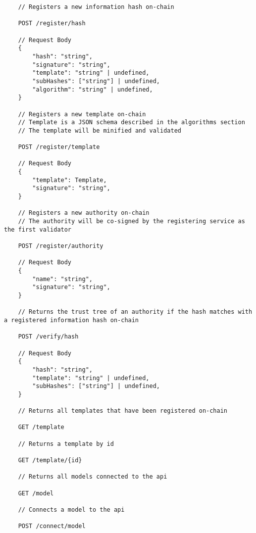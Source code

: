 \documentclass[../ockr-specification.tex]{subfiles}
\begin{document}
\begin{lstlisting}
    // Registers a new information hash on-chain

    POST /register/hash

    // Request Body
    {
        "hash": "string",
        "signature": "string",
        "template": "string" | undefined,
        "subHashes": ["string"] | undefined,
        "algorithm": "string" | undefined,
    }

    // Registers a new template on-chain
    // Template is a JSON schema described in the algorithms section
    // The template will be minified and validated 

    POST /register/template

    // Request Body
    {
        "template": Template,
        "signature": "string",
    }

    // Registers a new authority on-chain
    // The authority will be co-signed by the registering service as the first validator

    POST /register/authority

    // Request Body
    {
        "name": "string",
        "signature": "string",
    }

    // Returns the trust tree of an authority if the hash matches with a registered information hash on-chain

    POST /verify/hash

    // Request Body
    {
        "hash": "string",
        "template": "string" | undefined,
        "subHashes": ["string"] | undefined,
    }

    // Returns all templates that have been registered on-chain

    GET /template

    // Returns a template by id

    GET /template/{id}

    // Returns all models connected to the api

    GET /model

    // Connects a model to the api

    POST /connect/model

\end{lstlisting}

\newpage
\end{document}
